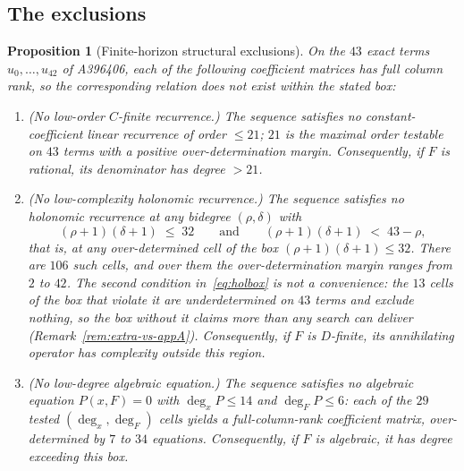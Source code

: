 \documentclass[11pt]{article}
\theoremstyle{plain}
\newtheorem{proposition}[theorem]{Proposition}
\theoremstyle{definition}
\theoremstyle{remark}
\begin{document}
\subsection*{The exclusions}

\begin{proposition}[Finite-horizon structural exclusions]
\label{prop:finite-horizon}
On the $43$ exact terms $u_0,\ldots,u_{42}$ of A396406, each of the
following coefficient matrices has full column rank, so the corresponding
relation does not exist within the stated box:
\begin{enumerate}[label=\textup{(\roman*)},itemsep=0.2em]
\item \textup{(No low-order $C$-finite recurrence.)} The sequence satisfies
no constant-coefficient linear recurrence of order $\le 21$; $21$ is the
maximal order testable on $43$ terms with a positive over-determination
margin. Consequently, if $F$ is rational, its denominator has degree
$> 21$.
\item \textup{(No low-complexity holonomic recurrence.)} The sequence
satisfies no holonomic recurrence at any bidegree $(\rho,\delta)$ with
\begin{equation}\label{eq:holbox}
  (\rho+1)(\delta+1) \;\le\; 32
  \qquad\text{and}\qquad
  (\rho+1)(\delta+1) \;<\; 43 - \rho ,
\end{equation}
that is, at any \emph{over-determined} cell of the box
$(\rho+1)(\delta+1)\le 32$. There are $106$ such cells, and over them the
over-determination margin ranges from $2$ to $42$. The second condition
in~\eqref{eq:holbox} is not a convenience: the $13$ cells of the box that
violate it are underdetermined on $43$ terms and exclude nothing, so the box
without it claims more than any search can deliver
(Remark~\ref{rem:extra-vs-appA}). Consequently, if $F$ is $D$-finite, its
annihilating operator has complexity outside this region.
\item \textup{(No low-degree algebraic equation.)} The sequence satisfies
no algebraic equation $P(x,F)=0$ with $\deg_x P \le 14$ and
$\deg_F P \le 6$: each of the $29$ tested $(\deg_x,\deg_F)$ cells yields a
full-column-rank coefficient matrix, over-determined by $7$ to $34$
equations. Consequently, if $F$ is algebraic, it has degree exceeding this
box.
\end{enumerate}
\end{proposition}
\end{document}
